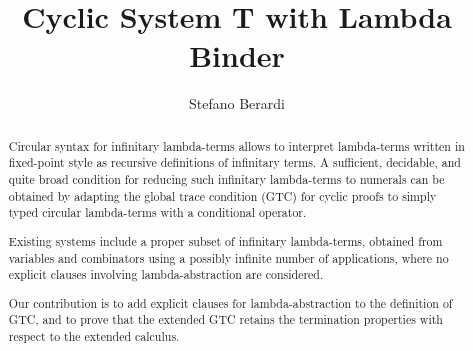 \documentclass[a4paper,anonymous]{lipics-v2021}
\title{Cyclic System T with Lambda Binder}
\author
    {Stefano Berardi}
    {Computer Science Department, Turin University, Torino, Italy}
    {} %
    {0000-0001-5427-0020} %
    {} %
\begin{document}
\maketitle

\begin{abstract}
%
Circular syntax for infinitary lambda-terms allows to interpret lambda-terms written in fixed-point style as recursive definitions of infinitary terms. A sufficient, decidable, and quite broad condition for reducing such infinitary lambda-terms to numerals can be obtained by adapting the global trace condition (GTC) for cyclic proofs to simply typed circular lambda-terms with a conditional operator. 

Existing systems include a proper subset of infinitary lambda-terms, obtained from variables and combinators using a possibly infinite number of applications, where no explicit clauses involving lambda-abstraction are considered. 

Our contribution is to add explicit clauses for lambda-abstraction to the definition of GTC, and to prove that the extended GTC retains the termination properties with respect to the extended calculus.
\end{abstract}
\end{document}
